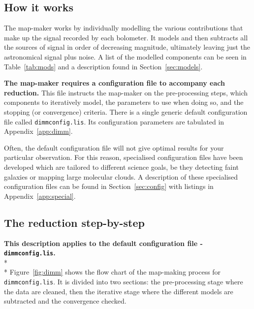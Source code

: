 \documentclass[twoside,11pt]{article}
\newcommand{\htmlref}[2]{#1}
\newcommand{\latexhtml}[2]{#1}
\newcommand{\xlabel}[1]{}
\renewcommand{\_}{\texttt{\symbol{95}}}
\newcommand{\file}[1]{\texttt{#1}}
\newcommand{\cref}[3]{\latexhtml{#1~\ref{#2}}{\htmlref{#3}{#2}}}
\begin{document}
\subsection{\xlabel{dimm_theory}How it works}

The map-maker works by individually modelling the various
contributions that make up the signal recorded by each bolometer. It
models and then subtracts all the sources of signal in order of
decreasing magnitude, ultimately leaving just the astronomical signal
plus noise. A list of the modelled components can be seen in
\cref{Table}{tab:mods}{tabulated} and a description found in
\cref{Section}{sec:models}{The individual models}.

\textbf{The map-maker requires a configuration file to accompany each
reduction.} This file instructs the map-maker on the pre-processing
steps, which components to iteratively model, the parameters to use
when doing so, and the stopping (or convergence) criteria.
There is a single generic default configuration
file called \file{dimmconfig.lis}.  Its configuration parameters are
tabulated in \cref{Appendix}{app:dimm}{an appendix}.

Often, the default configuration file will not give optimal results
for your particular observation. For this reason, specialised
configuration files have been developed which are tailored to
different science goals, be they detecting faint galaxies or mapping
large molecular clouds. A
description of these specialised configuration files can be found
\cref{in Section}{sec:config}{here} with listings
\cref{in Appendix}{app:special}{this appendix}.


\subsection{The reduction step-by-step}

\textbf{This description applies to the default configuration file -
\file{dimmconfig.lis}.}\\*\\* \cref{Figure}{fig:dimm}{The graphic
below} shows the flow chart of the map-making process
for \file{dimmconfig.lis}. It is divided into two sections: the
pre-processing stage where the data are cleaned, then the iterative
stage where the different models are subtracted and the convergence checked.
\end{document}
